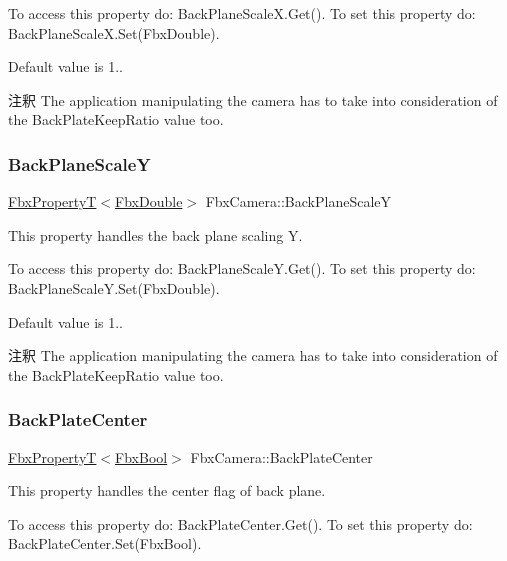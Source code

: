 To access this property do\+: Back\+Plane\+Scale\+X.\+Get(). To set this property do\+: Back\+Plane\+Scale\+X.\+Set(\+Fbx\+Double).

Default value is 1.. \begin{DoxyRemark}{注釈}
The application manipulating the camera has to take into consideration of the Back\+Plate\+Keep\+Ratio value too. 
\end{DoxyRemark}
\mbox{\label{class_fbx_camera_a24d51fab8fc1c619d813375b2aa88cfe}} 
\subsubsection{\texorpdfstring{Back\+Plane\+ScaleY}{BackPlaneScaleY}}
{\footnotesize\ttfamily \hyperlink{class_fbx_property_t}{Fbx\+PropertyT}$<$\hyperlink{fbxtypes_8h_a171e72a1c46fc15c1a6c9c31948c1c5b}{Fbx\+Double}$>$ Fbx\+Camera\+::\+Back\+Plane\+ScaleY}

This property handles the back plane scaling Y.

To access this property do\+: Back\+Plane\+Scale\+Y.\+Get(). To set this property do\+: Back\+Plane\+Scale\+Y.\+Set(\+Fbx\+Double).

Default value is 1.. \begin{DoxyRemark}{注釈}
The application manipulating the camera has to take into consideration of the Back\+Plate\+Keep\+Ratio value too. 
\end{DoxyRemark}
\mbox{\label{class_fbx_camera_afc328eb5b70302973c991310d7ff9be3}} 
\subsubsection{\texorpdfstring{Back\+Plate\+Center}{BackPlateCenter}}
{\footnotesize\ttfamily \hyperlink{class_fbx_property_t}{Fbx\+PropertyT}$<$\hyperlink{fbxtypes_8h_a92e0562b2fe33e76a242f498b362262e}{Fbx\+Bool}$>$ Fbx\+Camera\+::\+Back\+Plate\+Center}

This property handles the center flag of back plane.

To access this property do\+: Back\+Plate\+Center.\+Get(). To set this property do\+: Back\+Plate\+Center.\+Set(\+Fbx\+Bool).

